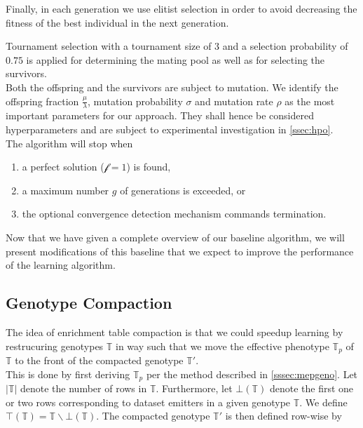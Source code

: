 Finally, in each generation we use elitist selection in order to avoid decreasing the fitness of the best individual in the next generation.

Tournament selection with a tournament size of $3$ and a selection probability of $0.75$ is applied for determining the mating pool as well as for selecting the survivors.\\

Both the offspring and the survivors are subject to mutation.
We identify the offspring fraction $\frac{\mu}{\lambda}$, mutation probability $\sigma$ and mutation rate $\rho$ as the most important parameters for our approach.
They shall hence be considered hyperparameters and are subject to experimental investigation in \autoref{ssec:hpo}.\\

The algorithm will stop when
\begin{enumerate}
  \item a perfect solution ($\mathcal{f}=1$) is found,
  \item a maximum number $g$ of generations is exceeded, or
  \item the optional convergence detection mechanism commands termination.
\end{enumerate}

Now that we have given a complete overview of our baseline algorithm, we will present modifications of this baseline that we expect to improve the performance of the learning algorithm.

\subsection{Genotype Compaction}
\label{ssec:compaction}

The idea of enrichment table compaction is that we could speedup learning by restrucuring genotypes $\mathbb{T}$ in way such that we move the effective phenotype $\mathbb{T}_p$ of $\mathbb{T}$ to the front of the compacted genotype $\mathbb{T}'$.\\

This is done by first deriving $\mathbb{T}_p$ per the method described in \autoref{sssec:mepgeno}.
Let $|\mathbb{T}|$ denote the number of rows in $\mathbb{T}$.
Furthermore, let $\bot(\mathbb{T})$ denote the first one or two rows corresponding to dataset emitters in a given genotype $\mathbb{T}$.
We define $\top(\mathbb{T})=\mathbb{T}\backslash\bot(\mathbb{T})$.
The compacted genotype $\mathbb{T}'$ is then defined row-wise by 

